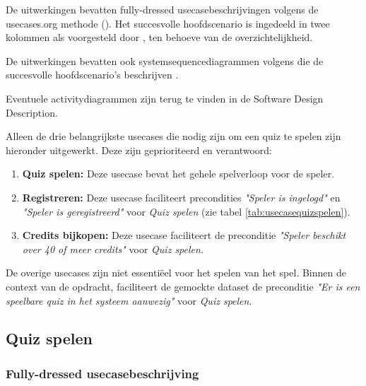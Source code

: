 De uitwerkingen bevatten fully-dressed usecasebeschrijvingen volgens de usecases.org methode (\cite[50]{larman}). Het succesvolle hoofdscenario is ingedeeld in twee kolommen als voorgesteld door \textcite{wirfsbrock}, ten behoeve van de overzichtelijkheid.

De uitwerkingen bevatten ook systemsequencediagrammen volgens \textcite{larman} die de succesvolle hoofdscenario's beschrijven .

Eventuele activitydiagrammen zijn terug te vinden in de Software Design Description.

Alleen de drie belangrijkste usecases die nodig zijn om een quiz te spelen zijn hieronder uitgewerkt. Deze zijn geprioriteerd en verantwoord:
\begin{enumerate}
   \item \textbf{Quiz spelen:} Deze usecase bevat het gehele spelverloop voor de speler.
   \item \textbf{Registreren:} Deze usecase faciliteert precondities \textit{"Speler is ingelogd"} en \textit{"Speler is geregistreerd"} voor \textit{Quiz spelen} (zie tabel \ref{tab:usecasequizspelen}).
   \item \textbf{Credits bijkopen:} Deze usecase faciliteert de preconditie \textit{"Speler beschikt over 40 of meer credits"} voor \textit{Quiz spelen}.
\end{enumerate}
De overige usecases zijn niet essentiëel voor het spelen van het spel. Binnen de context van de opdracht, faciliteert de gemockte dataset de preconditie \textit{"Er is een speelbare quiz in het systeem aanwezig"} voor \textit{Quiz spelen}.

\clearpage\subsection{Quiz spelen}

\subsubsection{Fully-dressed usecasebeschrijving}

